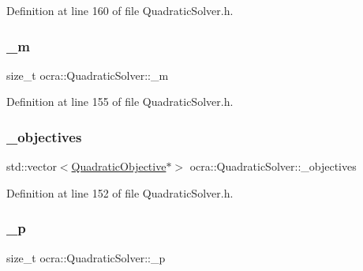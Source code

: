 Definition at line 160 of file Quadratic\+Solver.\+h.

\hypertarget{classocra_1_1QuadraticSolver_a7138115950652cc14b22ca87d8fc8b64}{}\label{classocra_1_1QuadraticSolver_a7138115950652cc14b22ca87d8fc8b64} 
\subsubsection{\texorpdfstring{\+\_\+m}{\_m}}
{\footnotesize\ttfamily size\+\_\+t ocra\+::\+Quadratic\+Solver\+::\+\_\+m\hspace{0.3cm}{\ttfamily [protected]}}



Definition at line 155 of file Quadratic\+Solver.\+h.

\hypertarget{classocra_1_1QuadraticSolver_a5c5ba942644eceb02326095343a642cb}{}\label{classocra_1_1QuadraticSolver_a5c5ba942644eceb02326095343a642cb} 
\subsubsection{\texorpdfstring{\+\_\+objectives}{\_objectives}}
{\footnotesize\ttfamily std\+::vector$<$\hyperlink{namespaceocra_a0b50673710f087c0f1733aefd1a8e0f7}{Quadratic\+Objective}$\ast$$>$ ocra\+::\+Quadratic\+Solver\+::\+\_\+objectives\hspace{0.3cm}{\ttfamily [protected]}}



Definition at line 152 of file Quadratic\+Solver.\+h.

\hypertarget{classocra_1_1QuadraticSolver_aee2e8409ab5338029910a78e2e196cd3}{}\label{classocra_1_1QuadraticSolver_aee2e8409ab5338029910a78e2e196cd3} 
\subsubsection{\texorpdfstring{\+\_\+p}{\_p}}
{\footnotesize\ttfamily size\+\_\+t ocra\+::\+Quadratic\+Solver\+::\+\_\+p\hspace{0.3cm}{\ttfamily [protected]}}



